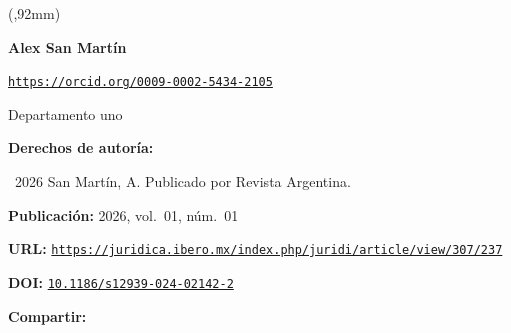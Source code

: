 \begin{textblock*}{68mm}(\gbbloquex,92mm)
{\setlength{\leftskip}{0pt}\setlength{\parindent}{0pt}%
\noindent\begin{minipage}[t]{68mm}
\sffamily\small\setlength{\parskip}{1pt}
{\bfseries\color{azulrevista}Alex San Martín}\par
{\scriptsize\texttt{\href{https://orcid.org/0009-0002-5434-2105}{https://orcid.org/0009-0002-5434-2105}}}\par
Departamento uno\par
\vspace{6pt}
{\bfseries\color{azulrevista!70}Derechos de autor\'ia:}\par
\textcopyright\ 2026 San Martín, A. Publicado por Revista Argentina. \par\vspace{6pt}
{\bfseries\color{azulrevista!70}Publicación:} 2026, vol.~01, n\'um.~01\par\vspace{6pt}
{\bfseries\color{azulrevista!70}URL:} {\scriptsize\texttt{\href{https://juridica.ibero.mx/index.php/juridi/article/view/307/237}{https://juridica.ibero.mx/index.php/juridi/article/view/307/237}}}\par\vspace{6pt}
{\bfseries\color{azulrevista!70}DOI:} {\scriptsize\texttt{\href{https://doi.org/10.1186/s12939-024-02142-2}{10.1186/s12939-024-02142-2}}}\par\vspace{6pt}
\vspace{6pt}
{\bfseries\color{azulrevista!70}Compartir:}\par\vspace{3pt}
{\large
\href{https://bsky.app/intent/compose?text=https%3A%2F%2Fjuridica.ibero.mx%2Findex.php%2Fjuridi%2Farticle%2Fview%2F307%2F237}{}~
\href{mailto:?subject=Las%20deudas%20pendientes%20de%20la%20digitalizaci%C3%B3n%20en%20Am%C3%A9rica%20Latina&body=https%3A%2F%2Fjuridica.ibero.mx%2Findex.php%2Fjuridi%2Farticle%2Fview%2F307%2F237}{}~
\href{https://www.facebook.com/sharer/sharer.php?u=https%3A%2F%2Fjuridica.ibero.mx%2Findex.php%2Fjuridi%2Farticle%2Fview%2F307%2F237}{}~
\href{https://www.linkedin.com/sharing/share-offsite/?url=https%3A%2F%2Fjuridica.ibero.mx%2Findex.php%2Fjuridi%2Farticle%2Fview%2F307%2F237}{}~
}
\end{minipage}}
\end{textblock*}
